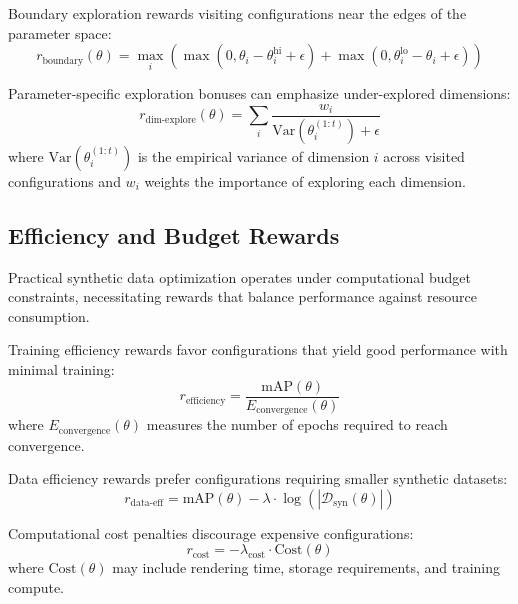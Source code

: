 Boundary exploration rewards visiting configurations near the edges of the parameter space:
\begin{equation}
r_{\text{boundary}}(\theta) = \max_i \left( \max(0, \theta_i - \theta_i^{\text{hi}} + \epsilon) + \max(0, \theta_i^{\text{lo}} - \theta_i + \epsilon) \right)
\label{eq:boundary_exploration}
\end{equation}

Parameter-specific exploration bonuses can emphasize under-explored dimensions:
\begin{equation}
r_{\text{dim-explore}}(\theta) = \sum_i \frac{w_i}{\text{Var}(\theta_i^{(1:t)}) + \epsilon}
\label{eq:dim_exploration}
\end{equation}
where $\text{Var}(\theta_i^{(1:t)})$ is the empirical variance of dimension $i$ across visited configurations and $w_i$ weights the importance of exploring each dimension.

\subsection{Efficiency and Budget Rewards}

Practical synthetic data optimization operates under computational budget constraints, necessitating rewards that balance performance against resource consumption.

Training efficiency rewards favor configurations that yield good performance with minimal training:
\begin{equation}
r_{\text{efficiency}} = \frac{\text{mAP}(\theta)}{E_{\text{convergence}}(\theta)}
\label{eq:efficiency_reward}
\end{equation}
where $E_{\text{convergence}}(\theta)$ measures the number of epochs required to reach convergence.

Data efficiency rewards prefer configurations requiring smaller synthetic datasets:
\begin{equation}
r_{\text{data-eff}} = \text{mAP}(\theta) - \lambda \cdot \log(|\mathcal{D}_{\text{syn}}(\theta)|)
\label{eq:data_efficiency}
\end{equation}

Computational cost penalties discourage expensive configurations:
\begin{equation}
r_{\text{cost}} = -\lambda_{\text{cost}} \cdot \text{Cost}(\theta)
\label{eq:cost_penalty}
\end{equation}
where $\text{Cost}(\theta)$ may include rendering time, storage requirements, and training compute.

